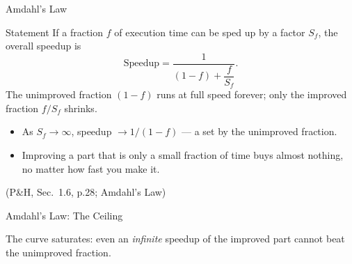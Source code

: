 \documentclass[aspectratio=169]{beamer}
\begin{document}
\begin{frame}{Amdahl's Law}
  \begin{block}{Statement}
    If a fraction $f$ of execution time can be sped up by a factor $S_f$, the
    overall speedup is
    \[
      \text{Speedup} = \frac{1}{(1-f) + \dfrac{f}{S_f}}.
    \]
    The unimproved fraction $(1-f)$ runs at full speed forever; only the
    improved fraction $f/S_f$ shrinks.
  \end{block}
  \begin{itemize}
    \item As $S_f \to \infty$, speedup $\to 1/(1-f)$ --- a 
      set by the unimproved fraction.
    \item Improving a part that is only a small fraction of time buys almost
      nothing, no matter how fast you make it.
  \end{itemize}
  (P\&H, Sec.~1.6, p.28; Amdahl's Law) \cite{PattersonHennessy2017_computer_organization_design}
\end{frame}

\begin{frame}{Amdahl's Law: The Ceiling}
  \begin{center}
  \end{center}
  The curve saturates: even an \emph{infinite} speedup of the improved part
  cannot beat the unimproved fraction.
\end{frame}
\end{document}
